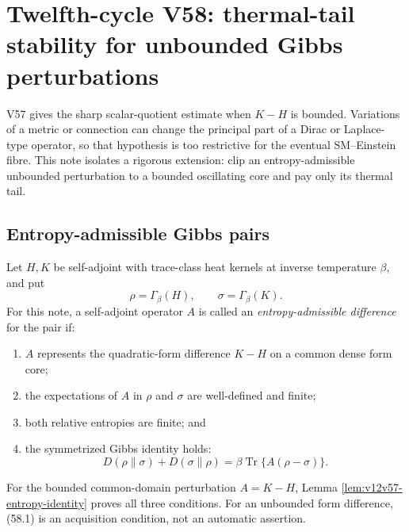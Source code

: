 \documentclass[11pt]{article}
\theoremstyle{remark}
\begin{document}

\section{Twelfth-cycle V58: thermal-tail stability for unbounded
Gibbs perturbations}
\label{sec:v12v58}

V57 gives the sharp scalar-quotient estimate when \(K-H\) is
bounded.  Variations of a metric or connection can change the
principal part of a Dirac or Laplace-type operator, so that
hypothesis is too restrictive for the eventual SM--Einstein fibre.
This note isolates a rigorous extension: clip an entropy-admissible
unbounded perturbation to a bounded oscillating core and pay only
its thermal tail.

\subsection{Entropy-admissible Gibbs pairs}

Let \(H,K\) be self-adjoint with trace-class heat kernels at inverse
temperature \(\beta\), and put
\[
 \rho=\Gamma_\beta(H),\qquad
 \sigma=\Gamma_\beta(K).
\]
For this note, a self-adjoint operator \(A\) is called an
\emph{entropy-admissible difference} for the pair if:
\begin{enumerate}
\item \(A\) represents the quadratic-form difference \(K-H\) on a
common dense form core;
\item the expectations of \(A\) in \(\rho\) and \(\sigma\) are
well-defined and finite;
\item both relative entropies are finite; and
\item the symmetrized Gibbs identity holds:
\begin{equation}
 D(\rho\|\sigma)+D(\sigma\|\rho)
 =
 \beta\operatorname{Tr}\{A(\rho-\sigma)\}.        \tag{58.1}
\end{equation}
\end{enumerate}
For the bounded common-domain perturbation \(A=K-H\), Lemma
\ref{lem:v12v57-entropy-identity} proves all three conditions.  For
an unbounded form difference, (58.1) is an acquisition condition,
not an automatic assertion.
\end{document}
